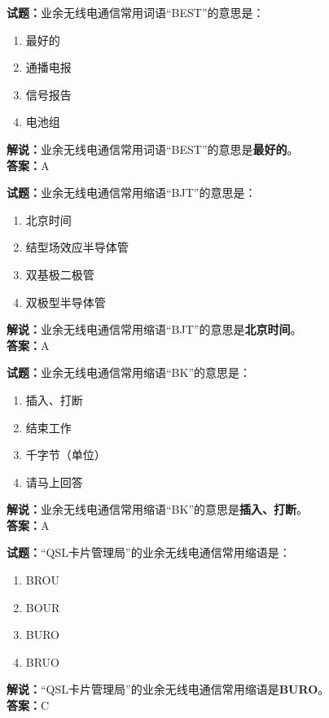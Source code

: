 \documentclass{ctexbook}
\begin{document}
\bigskip


\noindent\textbf{试题：}业余无线电通信常用词语“BEST”的意思是：
\begin{enumerate}[leftmargin=3em]
\item 最好的
\item 通播电报
\item 信号报告
\item 电池组
\end{enumerate}
\noindent\textbf{解说：}业余无线电通信常用词语“BEST”的意思是\textbf{最好的}。\\\noindent\textbf{答案：}A

\bigskip


\noindent\textbf{试题：}业余无线电通信常用缩语“BJT”的意思是：
\begin{enumerate}[leftmargin=3em]
\item 北京时间
\item 结型场效应半导体管
\item 双基极二极管
\item 双极型半导体管
\end{enumerate}
\noindent\textbf{解说：}业余无线电通信常用缩语“BJT”的意思是\textbf{北京时间}。\\\noindent\textbf{答案：}A


\bigskip


\noindent\textbf{试题：}业余无线电通信常用缩语“BK”的意思是：
\begin{enumerate}[leftmargin=3em]
\item 插入、打断
\item 结束工作
\item 千字节（单位）
\item 请马上回答
\end{enumerate}
\noindent\textbf{解说：}业余无线电通信常用缩语“BK”的意思是\textbf{插入、打断}。\\\noindent\textbf{答案：}A

\bigskip


\noindent\textbf{试题：}“QSL卡片管理局”的业余无线电通信常用缩语是：
\begin{enumerate}[leftmargin=3em]
\item BROU
\item BOUR
\item BURO
\item BRUO
\end{enumerate}
\noindent\textbf{解说：}“QSL卡片管理局”的业余无线电通信常用缩语是\textbf{BURO}。\\\noindent\textbf{答案：}C
\end{document}
